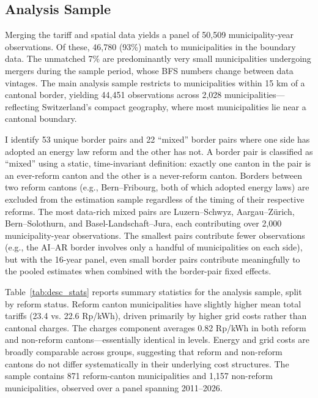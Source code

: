 \documentclass[12pt]{article}
\begin{document}
\subsection{Analysis Sample}

Merging the tariff and spatial data yields a panel of 50,509 municipality-year observations. Of these, 46,780 (93\%) match to municipalities in the boundary data. The unmatched 7\% are predominantly very small municipalities undergoing mergers during the sample period, whose BFS numbers change between data vintages. The main analysis sample restricts to municipalities within 15 km of a cantonal border, yielding 44,451 observations across 2,028 municipalities---reflecting Switzerland's compact geography, where most municipalities lie near a cantonal boundary.

I identify 53 unique border pairs and 22 ``mixed'' border pairs where one side has adopted an energy law reform and the other has not. A border pair is classified as ``mixed'' using a static, time-invariant definition: exactly one canton in the pair is an ever-reform canton and the other is a never-reform canton. Borders between two reform cantons (e.g., Bern--Fribourg, both of which adopted energy laws) are excluded from the estimation sample regardless of the timing of their respective reforms. The most data-rich mixed pairs are Luzern--Schwyz, Aargau--Zürich, Bern--Solothurn, and Basel-Landschaft--Jura, each contributing over 2,000 municipality-year observations. The smallest pairs contribute fewer observations (e.g., the AI--AR border involves only a handful of municipalities on each side), but with the 16-year panel, even small border pairs contribute meaningfully to the pooled estimates when combined with the border-pair fixed effects.

Table~\ref{tab:desc_stats} reports summary statistics for the analysis sample, split by reform status. Reform canton municipalities have slightly higher mean total tariffs (23.4 vs. 22.6 Rp/kWh), driven primarily by higher grid costs rather than cantonal charges. The charges component averages 0.82 Rp/kWh in both reform and non-reform cantons---essentially identical in levels. Energy and grid costs are broadly comparable across groups, suggesting that reform and non-reform cantons do not differ systematically in their underlying cost structures. The sample contains 871 reform-canton municipalities and 1,157 non-reform municipalities, observed over a panel spanning 2011--2026.


\end{document}
